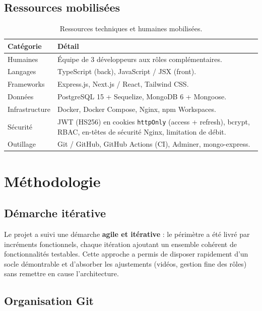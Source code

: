 \subsection{Ressources mobilisées}

\begin{table}[H]
\centering
\begin{tabularx}{\textwidth}{@{}l X@{}}
\toprule
\textbf{Catégorie} & \textbf{Détail} \\
\midrule
Humaines    & Équipe de 3 développeurs aux rôles complémentaires. \\
Langages    & TypeScript (back), JavaScript / JSX (front). \\
Frameworks  & Express.js, Next.js / React, Tailwind CSS. \\
Données     & PostgreSQL 15 + Sequelize, MongoDB 6 + Mongoose. \\
Infrastructure & Docker, Docker Compose, Nginx, npm Workspaces. \\
Sécurité    & JWT (HS256) en cookies \texttt{httpOnly} (access + refresh), bcrypt, RBAC, en-têtes de sécurité Nginx, limitation de débit. \\
Outillage   & Git / GitHub, GitHub Actions (CI), Adminer, mongo-express. \\
\bottomrule
\end{tabularx}
\caption{Ressources techniques et humaines mobilisées.}
\end{table}

\newpage

\section{Méthodologie}

\subsection{Démarche itérative}

Le projet a suivi une démarche \textbf{agile et itérative} : le périmètre a été
livré par incréments fonctionnels, chaque itération ajoutant un ensemble cohérent
de fonctionnalités testables. Cette approche a permis de disposer rapidement d'un
socle démontrable et d'absorber les ajustements (vidéos, gestion fine des rôles)
sans remettre en cause l'architecture.

\subsection{Organisation Git}

